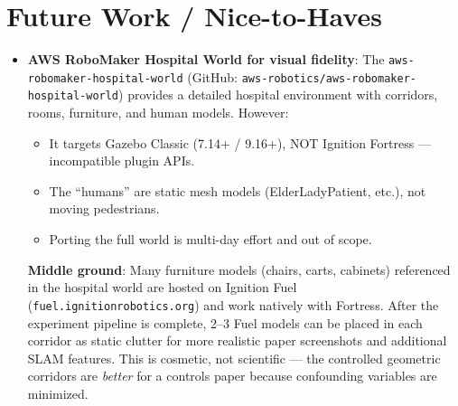 \documentclass[11pt]{article}
\begin{document}
\section*{Future Work / Nice-to-Haves}
\begin{itemize}
  \item \textbf{AWS RoboMaker Hospital World for visual fidelity}: The \texttt{aws-robomaker-hospital-world} (GitHub: \texttt{aws-robotics/aws-robomaker-hospital-world}) provides a detailed hospital environment with corridors, rooms, furniture, and human models. However:
    \begin{itemize}
      \item It targets Gazebo Classic (7.14+ / 9.16+), NOT Ignition Fortress --- incompatible plugin APIs.
      \item The ``humans'' are static mesh models (ElderLadyPatient, etc.), not moving pedestrians.
      \item Porting the full world is multi-day effort and out of scope.
    \end{itemize}
    \textbf{Middle ground}: Many furniture models (chairs, carts, cabinets) referenced in the hospital world are hosted on Ignition Fuel (\texttt{fuel.ignitionrobotics.org}) and work natively with Fortress. After the experiment pipeline is complete, 2--3 Fuel models can be placed in each corridor as static clutter for more realistic paper screenshots and additional SLAM features. This is cosmetic, not scientific --- the controlled geometric corridors are \emph{better} for a controls paper because confounding variables are minimized.
\end{itemize}
\end{document}
